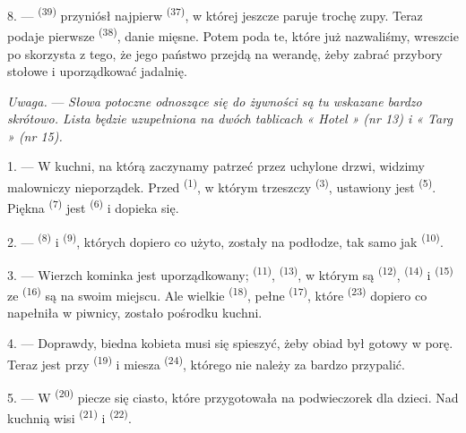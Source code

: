 8. ---  \textsuperscript{(39)} przyniósł najpierw 
\textsuperscript{(37)}, w której jeszcze paruje trochę zupy. Teraz podaje pierwsze
 \textsuperscript{(38)}, danie mięsne. Potem poda te, które już
nazwaliśmy, wreszcie po  skorzysta z tego, że jego państwo przejdą na
werandę, żeby zabrać przybory stołowe i uporządkować jadalnię.

\textit{Uwaga.} --- \textit{Słowa potoczne odnoszące się do żywności są tu wskazane
bardzo skrótowo. Lista będzie uzupełniona na dwóch tablicach « Hotel » (nr 13) i
« Targ » (nr 15).}

\VUsaut{4.6mm}
\VUsaut{3.0mm}

1. --- W kuchni, na którą zaczynamy patrzeć przez uchylone drzwi, widzimy malowniczy
nieporządek. Przed  \textsuperscript{(1)}, w którym trzeszczy
 \textsuperscript{(3)}, ustawiony jest 
\textsuperscript{(5)}. Piękna  \textsuperscript{(7)} jest
 \textsuperscript{(6)} i dopieka się.

2. ---  \textsuperscript{(8)} i 
\textsuperscript{(9)}, których dopiero co użyto, zostały na podłodze, tak samo jak
 \textsuperscript{(10)}.

3. --- Wierzch kominka jest uporządkowany;  \textsuperscript{(11)},
 \textsuperscript{(13)}, w którym są 
\textsuperscript{(12)},  \textsuperscript{(14)} i 
\textsuperscript{(15)} ze  \textsuperscript{(16)} są na swoim miejscu.
Ale wielkie  \textsuperscript{(18)}, pełne 
\textsuperscript{(17)}, które  \textsuperscript{(23)} dopiero co
napełniła w piwnicy, zostało pośrodku kuchni.

4. --- Doprawdy, biedna kobieta musi się spieszyć, żeby obiad był gotowy w porę. Teraz
jest przy  \textsuperscript{(19)} i miesza 
\textsuperscript{(24)}, którego nie należy za bardzo przypalić.

5. --- W  \textsuperscript{(20)} piecze się ciasto, które
przygotowała na podwieczorek dla dzieci. Nad kuchnią wisi 
\textsuperscript{(21)} i  \textsuperscript{(22)}.

